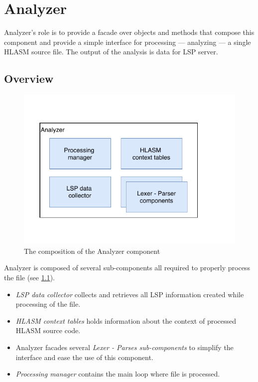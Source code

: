 \chapter {Analyzer}

Analyzer's role is to provide a facade over objects and methods that compose this component and provide a simple interface for processing --- analyzing --- a single HLASM source file. The output of the analysis is data for LSP server.

\section{Overview}

\begin{figure}
	\centering
	\includegraphics[width=\textwidth / 2]{img/analyzer_arch}
	\caption{The composition of the Analyzer component}
	\label{fig06:analyzer}
\end{figure}

Analyzer is composed of several sub-components all required to properly process the file (see \cref{fig06:analyzer}). 
\begin{itemize}
	\item \emph{LSP data collector} collects and retrieves all LSP information created while processing of the file.
	\item \emph{HLASM context tables} holds information about the context of processed HLASM source code.
	\item Analyzer facades several \emph{Lexer - Parses sub-components} to simplify the interface and ease the use of this component.
	\item \emph{Processing manager} contains the main loop where file is processed.
\end{itemize}


